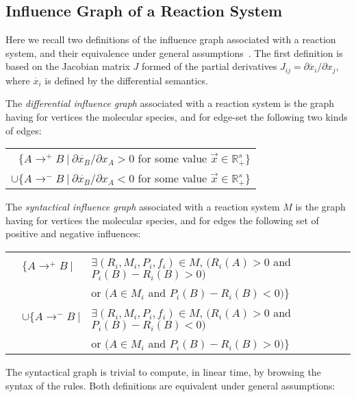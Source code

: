\documentclass{llncs}
\newcommand{\ra}{\rightarrow}
\begin{document}
\subsection{Influence Graph of a Reaction System}

Here we recall two definitions of the influence graph associated with a reaction
system, and their equivalence under general assumptions~\cite{FS08fmsb,FGS15tcs}.
The first definition is based on the Jacobian matrix $J$ formed of the partial derivatives 
$J_{ij} = {\partial \dot{x_i}}/ {\partial x_j}$, where $\dot{x_i}$ is defined by the differential semantics.

\begin{definition}\label{DIG}

The \emph{differential influence graph} associated with a reaction system is the
graph having for vertices the molecular species, and for edge-set the
following two kinds of edges:

\begin{tabular}{r}
   $\{A\ra^+B\ |\ {{\partial \dot{x_B}}/ {\partial x_A}} >0$ for some value $\vec x\in\mathbb{R}_+^s\}$\\
   $\cup\{A\ra^-B\ |\ {{\partial \dot{x_B}}/{\partial x_A}} <0$ for some value $\vec x\in\mathbb{R}_+^s\}$
\end{tabular}

\end{definition}

\begin{definition}

The \emph{syntactical influence graph} associated with a reaction system $M$ is
the graph having for vertices the molecular species, and for edges the
following set of positive and negative influences:

\begin{tabular}{lll}
&$\{A\ra^+B\ |$&$\exists (R_i, M_i, P_i, f_i)\in M$, $(R_i(A)>0$ and $P_i(B)-R_i(B)>0)$\\
&& or $(A\in M_i$ and $P_i(B)-R_i(B)<0)\}$\\
&$\cup\{A\ra^-B\ |$&$\exists (R_i, M_i, P_i, f_i)\in M$, $(R_i(A)>0$ and $P_i(B)-R_i(B)<0)$ \\
&&or $(A\in M_i$ and $P_i(B)-R_i(B)>0)\}$\\
\end{tabular}

\end{definition}

The syntactical graph is trivial to
compute, in linear time, by browsing the syntax of the rules.
Both definitions are equivalent under general assumptions:
\end{document}
